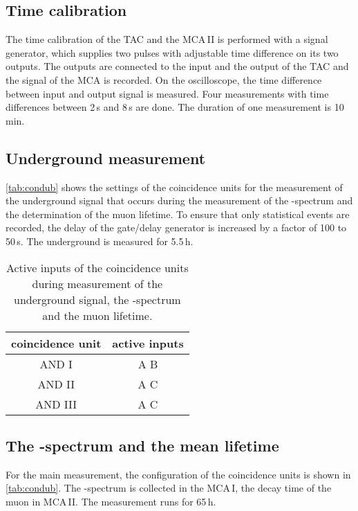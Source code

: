 \subsection{Time calibration}
The time calibration of the TAC and the MCA\,II is performed
with a signal generator,
which supplies two pulses with adjustable time difference on its two outputs.
The outputs are connected to the input and the output of the TAC and the signal
of the MCA is recorded.
On the oscilloscope, the time difference between input and output signal is measured.
Four measurements with time differences between 2\,\textmu s and 8\,\textmu s are done.
The duration of one measurement is 10\,min.


\subsection{Underground measurement}
\autoref{tab:condub} shows the settings of the coincidence units for the measurement of the underground
signal that occurs during the measurement of the \textbeta-spectrum and the determination of the muon lifetime.
To ensure that only statistical events are recorded, the delay of the gate/delay generator is increased by 
a factor of 100 to 50\,\textmu s. The underground is measured for 5.5\,h.


\begin{table}[H]
\caption{Active inputs of the coincidence units during measurement of the underground signal,
the \textbeta-spectrum and the muon lifetime.}
\begin{center}
\begin{tabular}{|c|c|}
  \hline
  coincidence unit	& active inputs	\\ \hline\hline
  AND I				& A B			\\ \hline
  AND II			& A	C			\\ \hline
  AND III			& A C			\\ \hline
 \end{tabular}
\end{center}
\label{tab:condub}
\end{table}

\subsection{The \textbeta-spectrum and the mean lifetime}

For the main measurement, the configuration of the coincidence units is shown in \autoref{tab:condub}.
The \textbeta-spectrum is collected in the MCA\,I, the decay time of the muon in MCA\,II.
The measurement runs for 65\,h.


